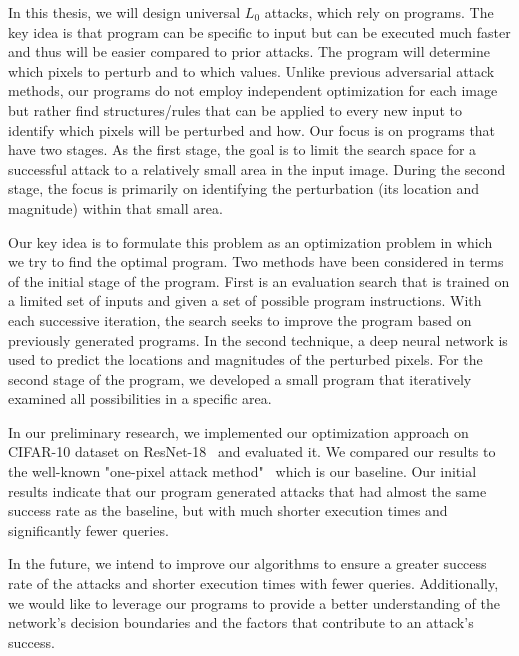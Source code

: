\documentclass[11pt]{article}
\begin{document}
In this thesis, we will design universal $L_0$ attacks, which rely on programs.
The key idea is that program can be specific to input but can be executed much faster and thus will be easier compared to prior attacks.
The program will determine which pixels to perturb and to which values. 
 Unlike previous adversarial attack methods, our programs do not employ independent optimization for each image but rather find structures/rules that can be applied to every new input to identify which pixels will be perturbed and how. 
 Our focus is on programs that have two stages. As the first stage, the goal is to limit the search space for a successful attack to a relatively small area in the input image. During the second stage, the focus is primarily on identifying the perturbation (its location and magnitude) within that small area.  
 
 Our key idea is to formulate this problem as an optimization problem in which we try to find the optimal program. Two methods have been considered in terms of the initial stage of the program. First is an evaluation search that is trained on a limited set of inputs and given a set of possible program instructions. With each successive iteration, the search seeks to improve the program based on previously generated programs. In the second technique, a deep neural network is used to predict the locations and magnitudes of the perturbed pixels. For the second stage of the program, we developed a small program that iteratively examined all possibilities in a specific area.  
 
 In our preliminary research, we implemented our optimization approach on CIFAR-10 dataset on ResNet-18~\cite{he2015deep} and evaluated it. We compared our results to the well-known "one-pixel attack method"~\cite{OnePixelAttack} which is our baseline. Our initial results indicate that our program generated attacks that had almost the same success rate as the baseline, but with much shorter execution times and significantly fewer queries.  

In the future, we intend to improve our algorithms to ensure a greater success rate of the attacks and shorter execution times with fewer queries. Additionally, we would like to leverage our programs to provide a better understanding of the network's decision boundaries and the factors that contribute to an attack's success.
\end{document}
